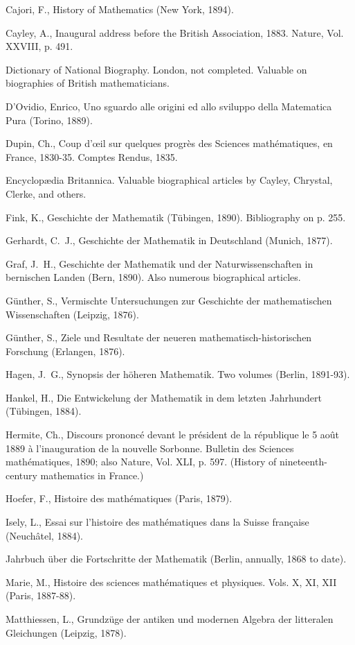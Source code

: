 \documentclass[oneside]{book}
\begin{document}
{Cajori, F., History of Mathematics (New York, 1894).

Cayley, A., Inaugural address before the British Association,
1883. Nature, Vol. XXVIII, p. 491.

Dictionary of National Biography. London, not completed. Valuable
on biographies of British mathematicians.

D'Ovidio, Enrico, Uno sguardo alle origini ed allo sviluppo della
Matematica Pura (Torino, 1889).

Dupin, Ch., Coup d'\oe{}il sur quelques progr\`es des Sciences
math\'ematiques, en France, 1830-35. Comptes Rendus, 1835.

Encyclop\ae{}dia Britannica. Valuable biographical articles by Cayley,
Chrystal, Clerke, and others.

Fink, K., Geschichte der Mathematik (T\"ubingen, 1890). Bibliography
on p. 255.

Gerhardt, C.~J., Geschichte der Mathematik in Deutschland (Munich,
1877).

Graf, J.~H., Geschichte der Mathematik und der Naturwissenschaften
in bernischen Landen (Bern, 1890). Also numerous biographical
articles.

G\"unther, S., Vermischte Untersuchungen zur Geschichte der
mathematischen Wissenschaften (Leipzig, 1876).

G\"unther, S., Ziele und Resultate der neueren
mathematisch-historischen Forschung (Erlangen, 1876).

Hagen, J.~G., Synopsis der h\"oheren Mathematik. Two volumes
(Berlin, 1891-93).

Hankel, H., Die Entwickelung der Mathematik in dem letzten
Jahrhundert (T\"ubingen, 1884).

Hermite, Ch., Discours prononc\'e devant le pr\'esident de la
r\'epublique le 5 ao\^ut 1889 \`a l'inauguration de la nouvelle
Sorbonne. Bulletin des Sciences math\'ematiques, 1890; also Nature,
Vol. XLI, p. 597. (History of nineteenth-century mathematics in
France.)

Hoefer, F., Histoire des math\'ematiques (Paris, 1879).

Isely, L., Essai sur l'histoire des math\'ematiques dans la Suisse
fran\c{c}aise (Neuch\^atel, 1884).

Jahrbuch \"uber die Fortschritte der Mathematik (Berlin, annually,
1868 to date).

Marie, M., Histoire des sciences math\'ematiques et physiques.
Vols. X, XI, XII (Paris, 1887-88).

Matthiessen, L., Grundz\"uge der antiken und modernen Algebra der
litteralen Gleichungen (Leipzig, 1878).

}
\end{document}
